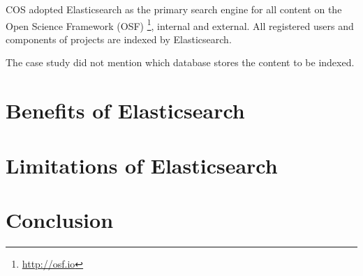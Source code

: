 COS adopted Elasticsearch as the primary search engine for all content on the  Open Science Framework (OSF) \footnote{\url{http://osf.io}}, internal and external. All registered users and components of projects are indexed by Elasticsearch.

The case study did not mention which database stores the content to be indexed.

\section{Benefits of Elasticsearch}
\label{sec:benefits}

\section{Limitations of Elasticsearch}
\label{sec:limitations}

\section{Conclusion}
\label{sec:conclusion}

